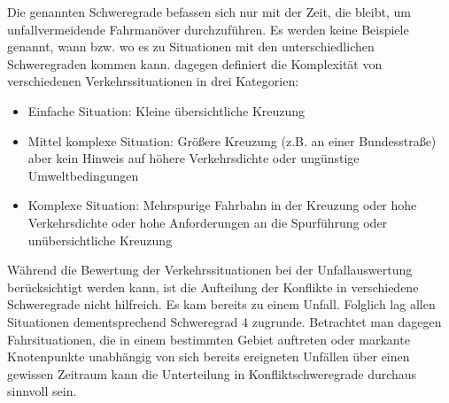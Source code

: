 Die genannten Schweregrade befassen sich nur mit der Zeit, die bleibt, um unfallvermeidende Fahrmanöver durchzuführen. Es werden keine Beispiele genannt, wann bzw. wo es zu Situationen mit den unterschiedlichen Schweregraden kommen kann. \Textcite[S. 33f]{Meitinger.2008} dagegen definiert die Komplexität von verschiedenen Verkehrssituationen in drei Kategorien:

\begin{itemize}
	\item Einfache Situation: Kleine übersichtliche Kreuzung	
	\item Mittel komplexe Situation: Größere Kreuzung (z.B. an einer Bundesstraße) aber kein Hinweis auf höhere Verkehrsdichte oder ungünstige Umweltbedingungen
	\item Komplexe Situation: Mehrspurige Fahrbahn in der Kreuzung oder hohe Verkehrsdichte oder hohe Anforderungen an die Spurführung oder unübersichtliche Kreuzung
\end{itemize}

Während die Bewertung der Verkehrssituationen bei der Unfallauswertung berücksichtigt werden kann, ist die Aufteilung der Konflikte in verschiedene Schweregrade nicht hilfreich. Es kam bereits zu einem Unfall. Folglich lag allen Situationen dementsprechend Schweregrad 4 zugrunde. Betrachtet man dagegen Fahrsituationen, die in einem bestimmten Gebiet auftreten oder markante Knotenpunkte unabhängig von sich bereits ereigneten Unfällen über einen gewissen Zeitraum kann die Unterteilung in Konfliktschweregrade durchaus sinnvoll sein.


